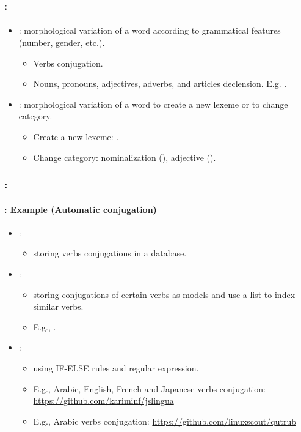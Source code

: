 \documentclass[xcolor=table]{beamer}
\begin{document}
\begin{frame}
	\frametitle{\insertshortsubtitle: \insertsection}
	\framesubtitle{\insertsubsection}

	\begin{itemize}
		\item {} : morphological variation of a word according to grammatical features (number, gender, etc.).
		\begin{itemize}
			\item Verbs conjugation.
			\item Nouns, pronouns, adjectives, adverbs, and articles declension. 
			E.g. .
		\end{itemize}
		\item {}: morphological variation of a word to create a new lexeme or to change category.
		\begin{itemize}
			\item Create a new lexeme: .
			\item Change category: nominalization (), adjective ().
		\end{itemize}
	\end{itemize}

\end{frame}

\begin{frame}
	\frametitle{\insertshortsubtitle: \insertsection}
	\framesubtitle{\insertsubsection: Example (Automatic conjugation)}

	\begin{itemize}
		\item {}:
		\begin{itemize}
			\item storing verbs conjugations in a database.
		\end{itemize}
		\item {}:
		\begin{itemize}
			\item storing conjugations of certain verbs as models and use a list to index similar verbs.
			\item E.g., .
		\end{itemize}
		\item {}:
		\begin{itemize}
			\item using IF-ELSE rules and regular expression.
			\item E.g., Arabic, English, French and Japanese verbs conjugation: \url{https://github.com/kariminf/jslingua}
			\item E.g., Arabic verbs conjugation: \url{https://github.com/linuxscout/qutrub}
		\end{itemize}
	\end{itemize}

\end{frame}
\end{document}

